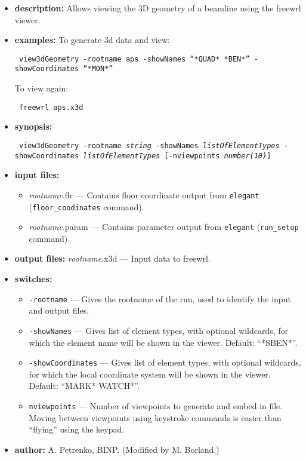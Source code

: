 \documentclass[11pt]{article}
\begin{document}
\begin{itemize}

\item {\bf description:} Allows viewing the 3D geometry of a beamline using the freewrl viewer.

\item {\bf examples:}
To generate 3d data and view:
\begin{flushleft}{\tt
view3dGeometry -rootname aps -showNames ``*QUAD* *BEN*'' -showCoordinates ``*MON*''
}\end{flushleft}
To view again:
\begin{flushleft}{\tt
freewrl aps.x3d
}\end{flushleft}

\item {\bf synopsis:}
\begin{flushleft}{\tt 
view3dGeometry -rootname {\em string} -showNames {\em listOfElementTypes} -showCoordinates {\em listOfElementTypes} [-nviewpoints {\em number(10)}]
}\end{flushleft}

\item {\bf input files:}
  \begin{itemize}
  \item {\em rootname}.flr --- Contains floor coordinate output from {\tt elegant} (\verb|floor_coodinates| command).
  \item {\em rootname}.param --- Contains parameter output from {\tt elegant} (\verb|run_setup| command).
  \end{itemize}

\item {\bf output files:}
{\em rootname}.x3d --- Input data to freewrl.

\item {\bf switches:}
\begin{itemize}
\item {\tt -rootname} --- Gives the rootname of the run, used to identify the input and output files.
\item {\tt -showNames} --- Gives list of element types, with optional wildcards, for which the element name will be shown 
  in the viewer.  Default: ``*SBEN*''.
\item {\tt -showCoordinates} --- Gives list of element types, with optional wildcards, for which the local coordinate system will be
  shown in the viewer.  Default: ``MARK* WATCH*''.
\item {\tt nviewpoints} --- Number of viewpoints to generate and embed in file. Moving between viewpoints using keystroke commands
  is easier than ``flying'' using the keypad.
\end{itemize}

\item {\bf author:} A. Petrenko, BINP. (Modified by M. Borland.)

\end{itemize}
\end{document}
